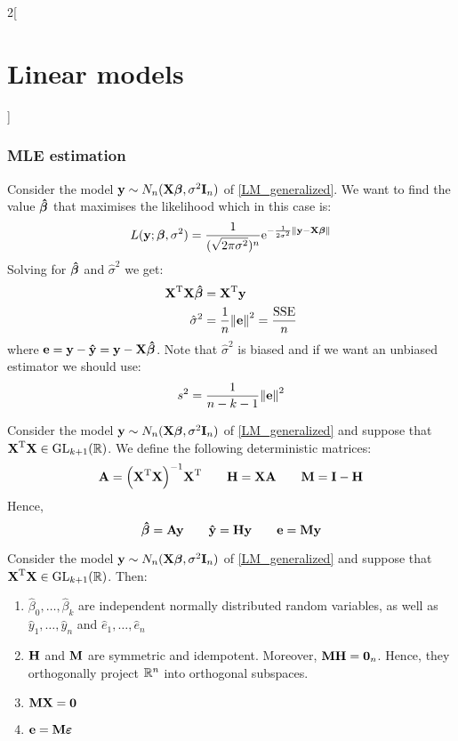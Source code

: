 \documentclass[../../../main_math.tex]{subfiles}
\begin{document}
\begin{multicols}{2}[\section{Linear models}]
  \subsubsection{MLE estimation}
  \begin{proposition}
    Consider the model $\boldsymbol{\mathrm{y}}\sim N_n(\boldsymbol{\mathrm{X\beta}},\sigma^2\boldsymbol{\mathrm{I}}_n)$ of \cref{LM_generalized}. We want to find the value $\boldsymbol{\mathrm{\hat\beta}}$ that maximises the likelihood which in this case is: $$L(\boldsymbol{\mathrm{y}};\boldsymbol{\mathrm{\beta}},\sigma^2)=\frac{1}{(\sqrt{2\pi\sigma^2})^n}\mathrm{e}^{-\frac{1}{2\sigma^2}{\|\boldsymbol{\mathrm{y}}-\boldsymbol{\mathrm{X\beta}}\|}}$$
    Solving for $\boldsymbol{\mathrm{\hat\beta}}$ and ${\hat\sigma}^2$ we get:
    \begin{align*}
      {\boldsymbol{\mathrm{X}}}^{\mathrm{T}}\boldsymbol{\mathrm{X\hat\beta}} & ={\boldsymbol{\mathrm{X}}}^{\mathrm{T}}\boldsymbol{\mathrm{y}}                            \\
      {\hat\sigma}^2                    & =\frac{1}{n}{\|\boldsymbol{\mathrm{e}}\|}^2=\frac{\mathrm{SSE}}{n}
    \end{align*}
    where $\boldsymbol{\mathrm{e}}=\boldsymbol{\mathrm{y}}-\boldsymbol{\mathrm{\hat{y}}}=\boldsymbol{\mathrm{y}}-\boldsymbol{\mathrm{X\hat{\beta}}}$. Note that ${\hat\sigma}^2$ is biased and if we want an unbiased estimator we should use:
    $${s}^2=\frac{1}{n-k-1}{\|\boldsymbol{\mathrm{e}}\|}^2$$
  \end{proposition}
  \begin{definition}
    Consider the model $\boldsymbol{\mathrm{y}}\sim N_n(\boldsymbol{\mathrm{X\beta}},\sigma^2\boldsymbol{\mathrm{I}}_n)$ of \cref{LM_generalized} and suppose that ${\boldsymbol{\mathrm{X}}}^{\mathrm{T}}\boldsymbol{\mathrm{X}}\in\mathrm{GL}_{k+1}(\mathbb{R})$. We define the following deterministic matrices:
    $$\boldsymbol{\mathrm{A}}={\left({\boldsymbol{\mathrm{X}}}^{\mathrm{T}}\boldsymbol{\mathrm{X}}\right)}^{-1}{\boldsymbol{\mathrm{X}}}^{\mathrm{T}}\qquad \boldsymbol{\mathrm{H}}=\boldsymbol{\mathrm{XA}}\qquad \boldsymbol{\mathrm{M}}=\boldsymbol{\mathrm{I}}-\boldsymbol{\mathrm{H}}$$
    Hence, $$\boldsymbol{\mathrm{\hat\beta}}=\boldsymbol{\mathrm{Ay}}\qquad\boldsymbol{\mathrm{\hat{y}}}=\boldsymbol{\mathrm{Hy}}\qquad\boldsymbol{\mathrm{e}}=\boldsymbol{\mathrm{My}}$$
  \end{definition}
  \begin{proposition}
    Consider the model $\boldsymbol{\mathrm{y}}\sim N_n(\boldsymbol{\mathrm{X\beta}},\sigma^2\boldsymbol{\mathrm{I}}_n)$ of \cref{LM_generalized} and suppose that ${\boldsymbol{\mathrm{X}}}^{\mathrm{T}}\boldsymbol{\mathrm{X}}\in\mathrm{GL}_{k+1}(\mathbb{R})$. Then:
    \begin{enumerate}
      \item $\hat\beta_0,\ldots,\hat\beta_k$ are independent normally distributed random variables, as well as $\hat{y}_1,\ldots,\hat{y}_n$ and $\hat{e}_1,\ldots,\hat{e}_n$
      \item $\boldsymbol{\mathrm{H}}$ and $\boldsymbol{\mathrm{M}}$ are symmetric and idempotent. Moreover, $\boldsymbol{\mathrm{MH}}=\boldsymbol{\mathrm{0}}_n$. Hence, they orthogonally project $\mathbb{R}^n$ into orthogonal subspaces.
      \item $\boldsymbol{\mathrm{MX}}=\boldsymbol{\mathrm{0}}$
      \item $\boldsymbol{\mathrm{e}}=\boldsymbol{\mathrm{M\varepsilon}}$

\end{enumerate}
\end{proposition}
\end{multicols}
\end{document}

